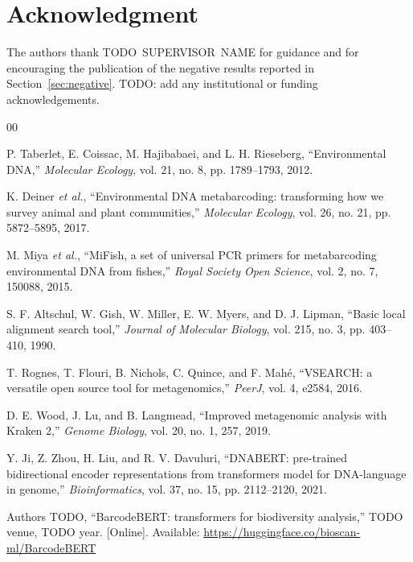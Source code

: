 \documentclass[conference]{IEEEtran}
\begin{document}
\section*{Acknowledgment}

The authors thank TODO~SUPERVISOR~NAME for guidance and for encouraging the
publication of the negative results reported in Section~\ref{sec:negative}.
TODO: add any institutional or funding acknowledgements.

\begin{thebibliography}{00}

 P. Taberlet, E. Coissac, M. Hajibabaei, and L. H.
Rieseberg, ``Environmental DNA,'' \emph{Molecular Ecology}, vol. 21, no. 8,
pp. 1789--1793, 2012.

 K. Deiner \emph{et al.}, ``Environmental DNA
metabarcoding: transforming how we survey animal and plant communities,''
\emph{Molecular Ecology}, vol. 26, no. 21, pp. 5872--5895, 2017.

 M. Miya \emph{et al.}, ``MiFish, a set of universal PCR
primers for metabarcoding environmental DNA from fishes,'' \emph{Royal
Society Open Science}, vol. 2, no. 7, 150088, 2015.

 S. F. Altschul, W. Gish, W. Miller, E. W. Myers, and D. J.
Lipman, ``Basic local alignment search tool,'' \emph{Journal of Molecular
Biology}, vol. 215, no. 3, pp. 403--410, 1990.

 T. Rognes, T. Flouri, B. Nichols, C. Quince, and F.
Mah\'e, ``VSEARCH: a versatile open source tool for metagenomics,''
\emph{PeerJ}, vol. 4, e2584, 2016.

 D. E. Wood, J. Lu, and B. Langmead, ``Improved
metagenomic analysis with Kraken 2,'' \emph{Genome Biology}, vol. 20, no. 1,
257, 2019.

 Y. Ji, Z. Zhou, H. Liu, and R. V. Davuluri, ``DNABERT:
pre-trained bidirectional encoder representations from transformers model
for DNA-language in genome,'' \emph{Bioinformatics}, vol. 37, no. 15, pp.
2112--2120, 2021.

Authors TODO, ``BarcodeBERT: transformers for biodiversity analysis,''
TODO venue, TODO year. [Online]. Available:
\url{https://huggingface.co/bioscan-ml/BarcodeBERT}


\end{thebibliography}
\end{document}

